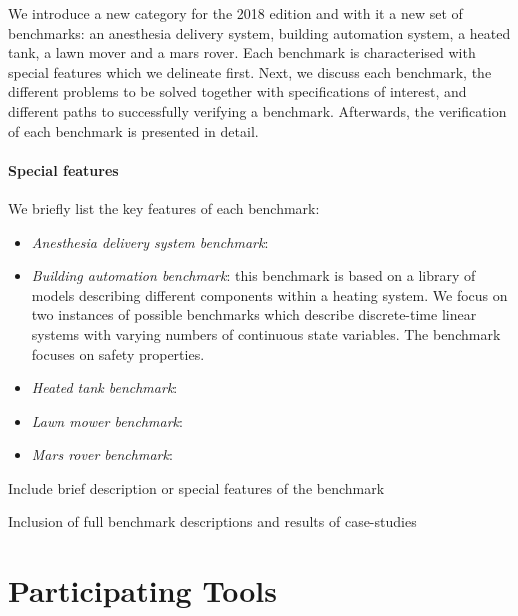 \documentclass[EPiC]{easychair}
\newcommand{\todo}[1]{
  \begin{framed}
    \noindent{\bf TODO: }
    #1
  \end{framed}
}
\begin{document}
We introduce a new category for the 2018 edition and with it a new set of benchmarks: an anesthesia delivery system, building automation system, a heated tank, a lawn mover and a mars rover. Each benchmark is characterised with special features which we delineate first. Next, we discuss each benchmark, the different problems to be solved together with specifications of interest, and different paths to successfully verifying a benchmark. Afterwards, the verification of each benchmark is presented in detail. \\

\paragraph{Special features} We briefly list the key features of each benchmark:
\begin{itemize}
	\item \textit{Anesthesia delivery system benchmark}: 
	\item \textit{Building automation benchmark}: this benchmark is based on a library of models describing different components within a heating system. We focus on two instances of possible benchmarks which describe discrete-time linear systems with varying numbers of continuous state variables. The benchmark focuses on safety properties.
	\item \textit{Heated tank benchmark}: 
    \item \textit{Lawn mower benchmark}:
    \item \textit{Mars rover benchmark}:
\end{itemize}

\todo{Include brief description or special features of the benchmark}


\newpage


\newpage


\newpage


\newpage



\todo{Inclusion of full benchmark descriptions and results of case-studies}

\section{Participating Tools}
\label{sect:tools}
\end{document}
